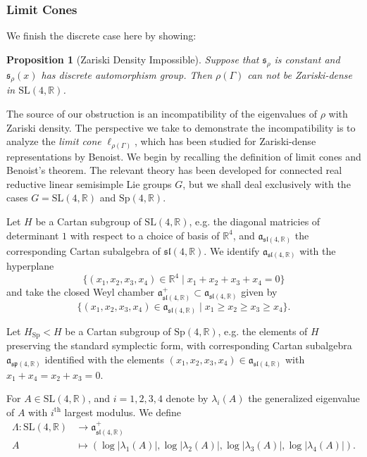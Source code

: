 \documentclass[12pt,a4paper]{amsart}
\newcommand{\bbR}{\mathbb R}
\theoremstyle{definition}
\theoremstyle{plain}
\newtheorem{proposition}[theorem]{Proposition}
\numberwithin{equation}{section}
\begin{document}
\subsubsection{Limit Cones}\label{subsubsection-Limit-Cone} We finish the discrete case here by showing:

\begin{proposition}[Zariski Density Impossible]\label{proposition-no-zariski-density}
    Suppose that $\mathfrak{s}_\rho$ is constant and $\mathfrak{s}_\rho(x)$ has discrete automorphism group. Then $\rho(\Gamma)$ can not be Zariski-dense in {\rm{$\text{SL}(4,\bbR)$}}.
\end{proposition}

The source of our obstruction is an incompatibility of the eigenvalues of $\rho$ with Zariski density. The perspective we take to demonstrate the incompatibility is to analyze the \textit{limit cone} $\ell_{\rho(\Gamma)}$, which has been studied for Zariski-dense representations by Benoist. We begin by recalling the definition of limit cones and Benoist's theorem. The relevant theory has been developed for connected real reductive linear semisimple Lie groups $G$, but we shall deal exclusively with the cases $G = \text{SL}(4,\bbR)$ and $\text{Sp}(4,\bbR)$.

Let $H$ be a Cartan subgroup of $\text{SL}(4,\bbR)$, e.g. the diagonal matricies of determinant $1$ with respect to a choice of basis of $\bbR^4$, and $\mathfrak{a}_{\mathfrak{sl}(4,\bbR)}$ the corresponding Cartan subalgebra of $\mathfrak{sl}(4,\bbR)$. We identify $\mathfrak{a}_{\mathfrak{sl}(4,\bbR)}$ with the hyperplane $$\{ (x_1, x_2, x_3, x_4) \in \bbR^4 \mid x_1 + x_2 + x_3 + x_4 = 0 \} $$
and take the closed Weyl chamber $\mathfrak{a}_{\mathfrak{sl}(4,\bbR)}^+ \subset \mathfrak{a}_{\mathfrak{sl}(4,\bbR)}$ given by $$\{(x_1, x_2, x_3,x_4) \in \mathfrak{a}_{\mathfrak{sl}(4,\bbR)} \mid x_1 \geq x_2 \geq x_3 \geq x_4 \}.$$

Let $H_{\text{Sp}} < H$ be a Cartan subgroup of $\text{Sp}(4,\bbR)$, e.g. the elements of $H$ preserving the standard symplectic form, with corresponding Cartan subalgebra $\mathfrak{a}_{\mathfrak{sp}(4,\bbR)}$ identified with the elements $(x_1, x_2, x_3, x_4) \in \mathfrak{a}_{\mathfrak{sl}(4,\bbR)}$ with $x_1 + x_4 = x_2 + x_3 = 0$.

For $A \in \text{SL}(4,\bbR)$, and $i =1,2,3,4$ denote by $\lambda_i(A)$ the generalized eigenvalue of $A$ with $i^{\text{th}}$ largest modulus. We define \begin{align*}
    \Lambda: \text{SL}(4,\bbR) &\to \mathfrak{a}^+_{\mathfrak{sl}(4,\bbR)} \\ A &\mapsto (\log |\lambda_1(A)|, \log |\lambda_2(A)|, \log |\lambda_3(A)|, \log |\lambda_4(A)|).
\end{align*} 
\end{document}
